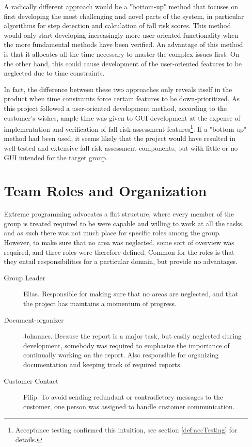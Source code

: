 A radically different approach would be a "bottom-up" method that focuses on first developing the most challenging and novel parts of the system, in particular algorithms for step detection and calculation of fall risk scores. This method would only start developing increasingly more user-oriented functionality when the more fundamental methods have been verified. An advantage of this method is that it allocates all the time necessary to master the complex issues first. On the other hand, this could cause development of the user-oriented features to be neglected due to time constraints. 

In fact, the difference between these two approaches only reveals itself in the product when time constraints force certain features to be down-prioritized. As this project followed a user-oriented development method, according to the customer's wishes, ample time was given to GUI development at the expense of implementation and verification of fall risk assessment features\footnote{Acceptance testing confirmed this intuition, see section \ref{def:accTesting} for details.}. If a "bottom-up" method had been used, it seems likely that the project would have resulted in well-tested and extensive fall risk assessment components, but with little or no GUI intended for the target group. 

\section{Team Roles and Organization}
Extreme programming advocates a flat structure, where every member of the group is treated required to be were capable and willing to work at all the tasks, and as such there was not much place for specific roles among the group. However, to make sure that no area was neglected, some sort of overview was required, and three roles were therefore defined. Common for the roles is that they entail responsibilities for a particular domain, but provide no advantages.

\begin{description}
\item[Group Leader] Elias. Responsible for making sure that no areas are neglected, and that the project has maintains a momentum of progress.
\item[Document-organizer] Johannes. Because the report is a major task, but easily neglected during development, somebody was required to emphasize the importance of continually working on the report. Also responsible for organizing documentation and keeping track of required reports.
\item[Customer Contact] Filip. To avoid sending redundant or contradictory messages to the customer, one person was assigned to handle customer communication.
\end{description}
 
